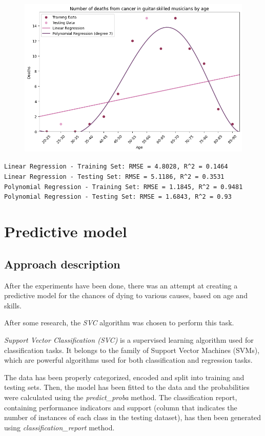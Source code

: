 \documentclass{article}
\begin{document}
\begin{figure} [H]
    \centering
    \includegraphics[width=0.6\linewidth]{graph_images/experiments/exp8.png}
    \label{fig:enter-label}
\end{figure}

\noindent\texttt{Linear Regression - Training Set: RMSE = 4.8028, R\textasciicircum2 = 0.1464\\
Linear Regression - Testing Set: RMSE = 5.1186, R\textasciicircum2 = 0.3531\\
Polynomial Regression - Training Set: RMSE = 1.1845, R\textasciicircum2 = 0.9481\\
Polynomial Regression - Testing Set: RMSE = 1.6843, R\textasciicircum2 = 0.93\\}




\section{Predictive model}
\subsection{Approach description}
After the experiments have been done, there was an attempt at creating a predictive model for the chances of dying to various causes, based on age and skills.

After some research, the \textit{SVC} algorithm was chosen to perform this task.

\textit{Support Vector Classification (SVC)} is a supervised learning algorithm used for classification tasks. It belongs to the family of Support Vector Machines (SVMs), which are powerful algorithms used for both classification and regression tasks.

The data has been properly categorized, encoded and split into training and testing sets. Then, the model has been fitted to the data and the probabilities were calculated using the \textit{predict\_proba} method. The classification report, containing performance indicators and support (column that indicates the number of instances of each class in the testing dataset), has then been generated using \textit{classification\_report} method.
\end{document}
